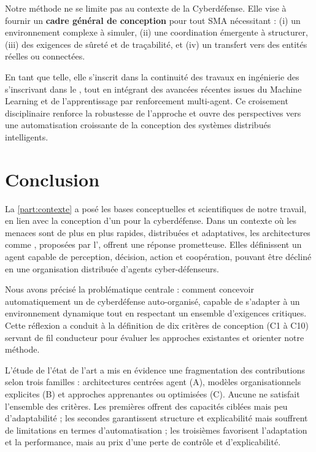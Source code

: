 Notre méthode ne se limite pas au contexte de la Cyberdéfense. Elle vise à fournir un \textbf{cadre général de conception} pour tout SMA nécessitant : (i) un environnement complexe à simuler, (ii) une coordination émergente à structurer, (iii) des exigences de sûreté et de traçabilité, et (iv) un transfert vers des entités réelles ou connectées.

En tant que telle, elle s'inscrit dans la continuité des travaux en ingénierie des  s'inscrivant dans le , tout en intégrant des avancées récentes issues du Machine Learning et de l'apprentissage par renforcement multi-agent. Ce croisement disciplinaire renforce la robustesse de l'approche et ouvre des perspectives vers une automatisation croissante de la conception des systèmes distribués intelligents.


\chapter*{Conclusion}

La \autoref{part:contexte} a posé les bases conceptuelles et scientifiques de notre travail, en lien avec la conception d'un  pour la cyberdéfense. Dans un contexte où les menaces sont de plus en plus rapides, distribuées et adaptatives, les architectures comme , proposées par l', offrent une réponse prometteuse. Elles définissent un agent capable de perception, décision, action et coopération, pouvant être décliné en une organisation distribuée d'agents cyber-défenseurs.

Nous avons précisé la problématique centrale : comment concevoir automatiquement un  de cyberdéfense auto-organisé, capable de s'adapter à un environnement dynamique tout en respectant un ensemble d'exigences critiques. Cette réflexion a conduit à la définition de dix critères de conception (C1 à C10) servant de fil conducteur pour évaluer les approches existantes et orienter notre méthode.

L'étude de l'état de l'art a mis en évidence une fragmentation des contributions selon trois familles : architectures centrées agent (A), modèles organisationnels explicites (B) et approches apprenantes ou optimisées (C). Aucune ne satisfait l'ensemble des critères. Les premières offrent des capacités ciblées mais peu d'adaptabilité ; les secondes garantissent structure et explicabilité mais souffrent de limitations en termes d'automatisation ; les troisièmes favorisent l'adaptation et la performance, mais au prix d'une perte de contrôle et d'explicabilité.

